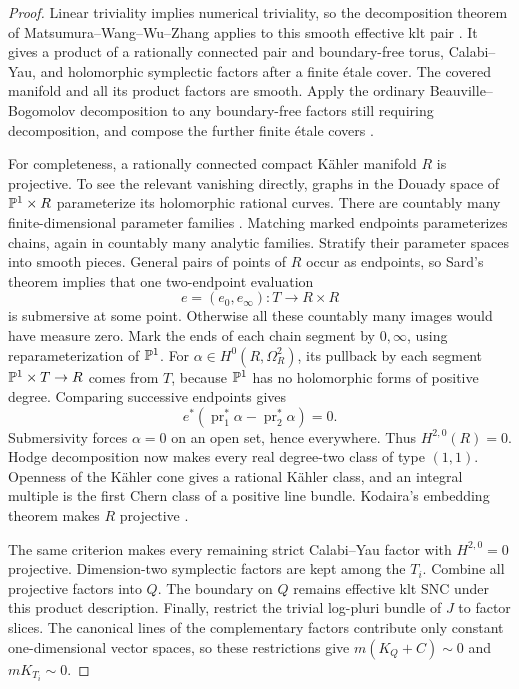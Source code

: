 \begin{proof}
Linear triviality implies numerical triviality, so the decomposition
theorem of Matsumura--Wang--Wu--Zhang applies to this smooth effective
klt pair
\cite[version~1, Corollary~1.3]{MWWWZ25}.
It gives a product of a rationally connected pair and boundary-free
torus, Calabi--Yau, and holomorphic symplectic factors after a finite
\'etale cover.  The covered manifold and all its product factors are
smooth.  Apply the ordinary
Beauville--Bogomolov decomposition to any boundary-free factors still
requiring decomposition, and compose the further finite \'etale
covers \cite[Theorem~1]{Beauville83}.

For completeness, a rationally connected compact K\"ahler manifold
\(R\) is projective.  To see the relevant vanishing directly, graphs
in the Douady space of \(\mathbb P^1\times R\) parameterize its holomorphic
rational curves.  There are countably many finite-dimensional
parameter families \cite{Fujiki79}.  Matching marked endpoints
parameterizes chains, again in countably many analytic families.
Stratify their parameter spaces into smooth pieces.  General pairs
of points of \(R\) occur as endpoints, so Sard's theorem implies that
one two-endpoint evaluation
\[
 e=(e_0,e_\infty):T\longrightarrow R\times R
\]
is submersive at some point.  Otherwise all these countably many
images would have measure zero.  Mark the ends of each chain segment
by \(0,\infty\), using reparameterization of \(\mathbb P^1\).
For \(\alpha\in H^0(R,\Omega_R^2)\), its pullback by each segment
\(\mathbb P^1\times T\to R\) comes from \(T\), because \(\mathbb P^1\) has no
holomorphic forms of positive degree.  Comparing successive endpoints
gives
\[
 e^*(\operatorname{pr}_1^*\alpha-\operatorname{pr}_2^*\alpha)=0.
\]
Submersivity forces \(\alpha=0\) on an open set, hence everywhere.
Thus \(H^{2,0}(R)=0\).  Hodge decomposition now makes every real
degree-two class of type \((1,1)\).  Openness of the K\"ahler cone
gives a rational K\"ahler class, and an integral multiple is the first
Chern class of a positive line bundle.  Kodaira's embedding theorem
makes \(R\) projective \cite{Kodaira54}.

The same criterion makes every remaining strict Calabi--Yau factor
with \(H^{2,0}=0\) projective.  Dimension-two symplectic factors are
kept among the \(T_i\).  Combine all projective factors into \(Q\).
The boundary on \(Q\) remains effective klt SNC under this product
description.  Finally, restrict the trivial log-pluri bundle of
\(J\) to factor slices.  The canonical lines of the complementary
factors contribute only constant one-dimensional vector spaces,
so these restrictions give \(m(K_Q+C)\sim0\) and \(mK_{T_i}\sim0\).
\end{proof}

